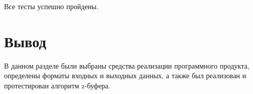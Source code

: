 Все тесты успешно пройдены.

\section{Вывод}
В данном разделе были выбраны средства реализации программного продукта, определены форматы входных и выходных данных, а также был реализован и протестирован алгоритм z-буфера.